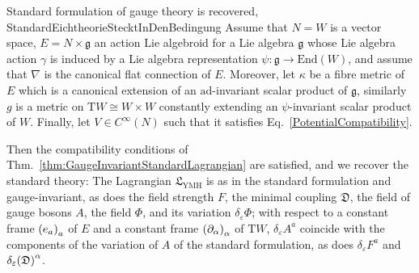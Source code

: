 \begin{theorems}{Standard formulation of gauge theory is recovered, \cite{CurvedYMH}}{StandardEichtheorieStecktInDenBedingung}
Assume that $N=W$ is a vector space, $E= N \times \mathfrak{g}$ an action Lie algebroid for a Lie algebra $\mathfrak{g}$ whose Lie algebra action $\gamma$ is induced by a Lie algebra representation $\psi: \mathfrak{g} \to \mathrm{End}(W)$, and assume that $\nabla$ is the canonical flat connection of $E$. Moreover, let $\kappa$ be a fibre metric of $E$ which is a canonical extension of an $\mathrm{ad}$-invariant scalar product of $\mathfrak{g}$, similarly $g$ is a metric on $\mathrm{T}W \cong W \times W$ constantly extending an $\psi$-invariant scalar product of $W$. Finally, let $V \in C^\infty(N)$ such that it satisfies Eq.~\eqref{PotentialCompatibility}.

Then the compatibility conditions of Thm.~\ref{thm:GaugeInvariantStandardLagrangian} are satisfied, and we recover the standard theory: The Lagrangian $\mathfrak{L}_{\mathrm{YMH}}$ is as in the standard formulation and gauge-invariant, as does the field strength $F$, the minimal coupling $\mathfrak{D}$, the field of gauge bosons $A$, the field $\Phi$, and its variation $\delta_\varepsilon \Phi$; with respect to a constant frame $\mleft( e_a \mright)_a$ of $E$ and a constant frame $\mleft(\partial_\alpha\mright)_\alpha$ of $\mathrm{T}W$, $\delta_\varepsilon A^a$ coincide with the components of the variation of $A$ of the standard formulation, as does $\delta_\varepsilon F^a$ and $\delta_\varepsilon \mleft( \mathfrak{D} \mright)^\alpha$.
\end{theorems}

